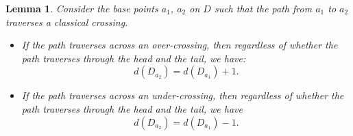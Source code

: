 \documentclass[11pt]{amsart}
\theoremstyle{noparens}
\newtheorem{lemma}{Lemma}[section]
\numberwithin{equation}{section}
\numberwithin{equation}{section}
\begin{document}
\begin{lemma} \label{Lemma 4.3} 
Consider the base points $a_1$, $a_2$ on $D$ such that the path from $a_1$ to $a_2$ traverses a classical crossing. 
\begin{itemize}
\item[(1)] If the path traverses across an over-crossing, then regardless of whether the path traverses through the head and the tail, we have:
\begin{equation*}
\label{equation 4.1}	
 d(D_{a_{2}}) = d(D_{a_1}) + 1.
\end{equation*} 
\item[(2)] If the path traverses across an under-crossing, then regardless of whether the path traverses through the head and the tail, we have
\begin{equation*}
 d(D_{a_2}) = d(D_{a_1}) - 1.
\end{equation*}
\end{itemize} 
\end{lemma}
\end{document}
